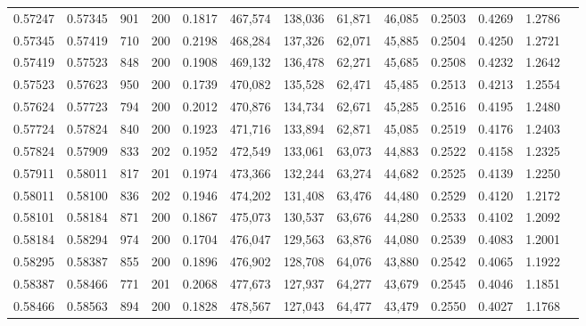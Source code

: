 \begin{tabular}{rrrrrrrrrrrrr}
0.57247 & 0.57345 &   901 & 200 &                                     0.1817 & 467,574 & 138,036 &  61,871 &  46,085 & 0.2503 & 0.4269 & 1.2786 \\
0.57345 & 0.57419 &   710 & 200 &                                     0.2198 & 468,284 & 137,326 &  62,071 &  45,885 & 0.2504 & 0.4250 & 1.2721 \\
0.57419 & 0.57523 &   848 & 200 &                                     0.1908 & 469,132 & 136,478 &  62,271 &  45,685 & 0.2508 & 0.4232 & 1.2642 \\
0.57523 & 0.57623 &   950 & 200 &                                     0.1739 & 470,082 & 135,528 &  62,471 &  45,485 & 0.2513 & 0.4213 & 1.2554 \\
0.57624 & 0.57723 &   794 & 200 &                                     0.2012 & 470,876 & 134,734 &  62,671 &  45,285 & 0.2516 & 0.4195 & 1.2480 \\
0.57724 & 0.57824 &   840 & 200 &                                     0.1923 & 471,716 & 133,894 &  62,871 &  45,085 & 0.2519 & 0.4176 & 1.2403 \\
0.57824 & 0.57909 &   833 & 202 &                                     0.1952 & 472,549 & 133,061 &  63,073 &  44,883 & 0.2522 & 0.4158 & 1.2325 \\
0.57911 & 0.58011 &   817 & 201 &                                     0.1974 & 473,366 & 132,244 &  63,274 &  44,682 & 0.2525 & 0.4139 & 1.2250 \\
0.58011 & 0.58100 &   836 & 202 &                                     0.1946 & 474,202 & 131,408 &  63,476 &  44,480 & 0.2529 & 0.4120 & 1.2172 \\
0.58101 & 0.58184 &   871 & 200 &                                     0.1867 & 475,073 & 130,537 &  63,676 &  44,280 & 0.2533 & 0.4102 & 1.2092 \\
0.58184 & 0.58294 &   974 & 200 &                                     0.1704 & 476,047 & 129,563 &  63,876 &  44,080 & 0.2539 & 0.4083 & 1.2001 \\
0.58295 & 0.58387 &   855 & 200 &                                     0.1896 & 476,902 & 128,708 &  64,076 &  43,880 & 0.2542 & 0.4065 & 1.1922 \\
0.58387 & 0.58466 &   771 & 201 &                                     0.2068 & 477,673 & 127,937 &  64,277 &  43,679 & 0.2545 & 0.4046 & 1.1851 \\
0.58466 & 0.58563 &   894 & 200 &                                     0.1828 & 478,567 & 127,043 &  64,477 &  43,479 & 0.2550 & 0.4027 & 1.1768 \\

\end{tabular}
